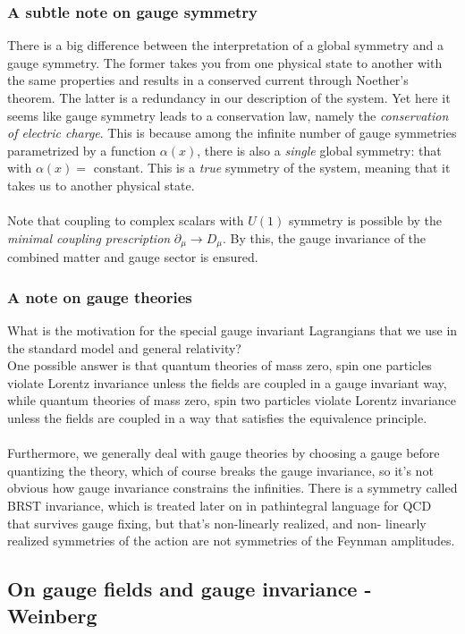 \subsubsection{A subtle note on gauge symmetry}
There is a big difference between the interpretation of a global symmetry and a gauge symmetry. The former takes you from one physical state to another with the same properties and results in a conserved current through Noether's theorem. The latter is a redundancy in our description of the system. Yet here it seems like gauge symmetry leads to a conservation law, namely the \emph{conservation of electric charge}. This is because among the infinite number of gauge symmetries parametrized by a function $\alpha(x)$, there is also a \emph{single} global symmetry: that with $\alpha(x) =$ constant. This is a \emph{true} symmetry of the system, meaning that it takes us to another physical state.\\
\\
Note that coupling to complex scalars with $U(1)$ symmetry is possible by the \emph{minimal coupling prescription} $\partial_{\mu} \rightarrow D_{\mu}$. By this, the gauge invariance of the combined matter and gauge sector is ensured.
\subsubsection{A note on gauge theories}
What is the motivation for the special gauge invariant Lagrangians that we use in the standard model and general relativity? \\
One possible answer is that quantum theories of mass
zero, spin one particles violate Lorentz invariance unless the fields
are coupled in a gauge invariant way, while quantum theories
of mass zero, spin two particles violate Lorentz invariance unless the fields are coupled in a way that satisfies the equivalence
principle.\\
\\
Furthermore, we generally deal with gauge theories by choosing a gauge before quantizing the theory, which of course breaks the gauge invariance, so it’s not obvious how gauge invariance constrains the
infinities. There is a symmetry called BRST invariance, which is treated later on in pathintegral language for QCD  that
survives gauge fixing, but that’s non-linearly realized, and non-
linearly realized symmetries of the action are not symmetries of
the Feynman amplitudes.
\subsection{On gauge fields and gauge invariance - Weinberg}

